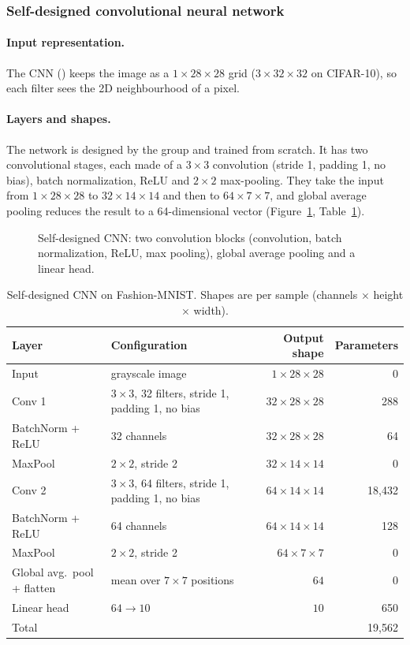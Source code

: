 \subsubsection{Self-designed convolutional neural network}
\paragraph{Input representation.} The CNN () keeps
the image as a $1\times28\times28$ grid ($3\times32\times32$ on CIFAR-10), so
each filter sees the 2D neighbourhood of a pixel.

\paragraph{Layers and shapes.} The network is designed by the group and trained
from scratch. It has two convolutional stages, each made of a $3\times3$
convolution (stride 1, padding 1, no bias), batch normalization, ReLU and
$2\times2$ max-pooling. They take the input from $1\times28\times28$ to
$32\times14\times14$ and then to $64\times7\times7$, and global average pooling
reduces the result to a 64-dimensional vector (Figure~\ref{fig:model-cnn},
Table~\ref{tab:cnn-layers}).

\begin{figure}[htbp]
\centering

\caption{Self-designed CNN: two convolution blocks (convolution, batch
normalization, ReLU, max pooling), global average pooling and a linear head.}
\label{fig:model-cnn}
\end{figure}

\begin{table}[htbp]
\centering\small
\caption{Self-designed CNN on Fashion-MNIST. Shapes are per sample
(channels $\times$ height $\times$ width).}
\label{tab:cnn-layers}
\begin{tabular}{llrr}
\toprule
Layer & Configuration & Output shape & Parameters\\\midrule
Input & grayscale image & $1\times28\times28$ & 0\\
Conv 1 & $3\times3$, 32 filters, stride 1, padding 1, no bias & $32\times28\times28$ & 288\\
BatchNorm + ReLU & 32 channels & $32\times28\times28$ & 64\\
MaxPool & $2\times2$, stride 2 & $32\times14\times14$ & 0\\
Conv 2 & $3\times3$, 64 filters, stride 1, padding 1, no bias & $64\times14\times14$ & 18,432\\
BatchNorm + ReLU & 64 channels & $64\times14\times14$ & 128\\
MaxPool & $2\times2$, stride 2 & $64\times7\times7$ & 0\\
Global avg.\ pool + flatten & mean over $7\times7$ positions & $64$ & 0\\
Linear head & $64\to10$ & $10$ & 650\\\midrule
Total & & & 19,562\\
\bottomrule
\end{tabular}
\end{table}

